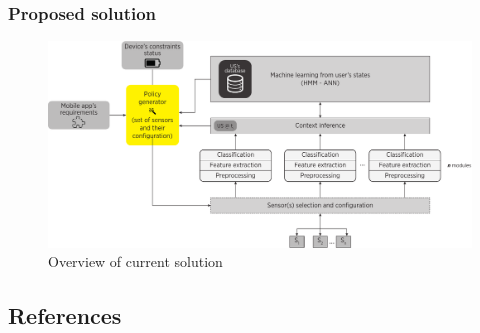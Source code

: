 \documentclass[compress,9pt,xcolor={dvipsnames,table}]{beamer}
\begin{document}
\begin{frame}\frametitle{Proposed solution}
\begin{figure}[tb]
  \centering
  \includegraphics[width=\textwidth]{../../../resources/images/vectors/policy-manager-incorporation}
  \caption{Overview of current solution}
  \label{fig:solution}
\end{figure}
\end{frame}

\subsection{References}

\small

\end{document}
